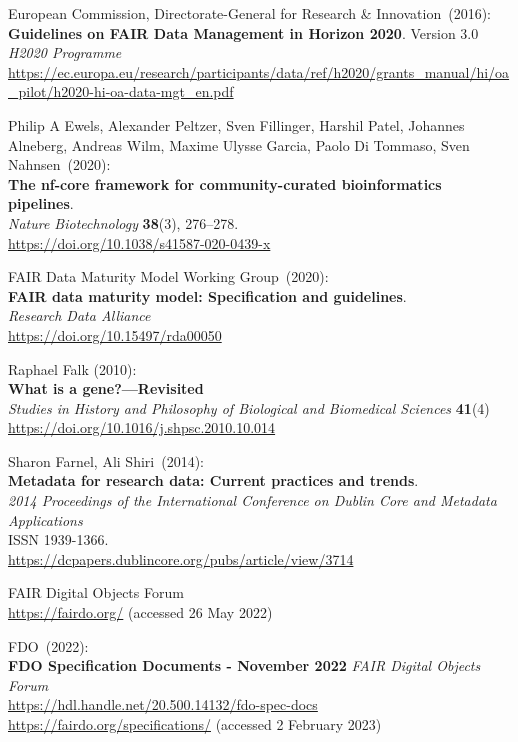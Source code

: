 \begin{thebibliography}{9}
European Commission, Directorate-General for Research \& Innovation~(2016): \\
\textbf{Guidelines on FAIR Data Management in Horizon 2020}. Version 3.0\\
\emph{H2020 Programme}\\
\url{https://ec.europa.eu/research/participants/data/ref/h2020/grants_manual/hi/oa_pilot/h2020-hi-oa-data-mgt_en.pdf}

Philip A Ewels, Alexander Peltzer, Sven Fillinger, Harshil Patel, Johannes Alneberg, Andreas Wilm, Maxime Ulysse Garcia, Paolo Di Tommaso, Sven Nahnsen~(2020): \\
\textbf{The nf-core framework for community-curated bioinformatics pipelines}.\\
\emph{Nature Biotechnology} \textbf{38}(3), 276--278.\\
\url{https://doi.org/10.1038/s41587-020-0439-x}

FAIR Data Maturity Model Working Group~(2020): \\
\textbf{FAIR data maturity model: Specification and guidelines}.\\
\emph{Research Data Alliance}\\
\url{https://doi.org/10.15497/rda00050}

Raphael Falk (2010):\\
\textbf{What is a gene?—Revisited} \\
\emph{Studies in History and Philosophy of Biological and Biomedical Sciences} \textbf{41}(4) \\ 
\url{https://doi.org/10.1016/j.shpsc.2010.10.014}

Sharon Farnel, Ali Shiri~(2014): \\
\textbf{Metadata for research data: Current practices and trends}.\\
\emph{2014 Proceedings of the International Conference on Dublin Core and Metadata Applications}\\
ISSN 1939-1366.\\
\url{https://dcpapers.dublincore.org/pubs/article/view/3714}

FAIR Digital Objects Forum \\
\url{https://fairdo.org/} (accessed 26 May 2022)

FDO~(2022): \\
\textbf{{FDO Specification Documents - November 2022}}
\emph{FAIR Digital Objects Forum}\\
\url{https://hdl.handle.net/20.500.14132/fdo-spec-docs}\\
\url{https://fairdo.org/specifications/} 
(accessed 2 February 2023) 


\end{thebibliography}
